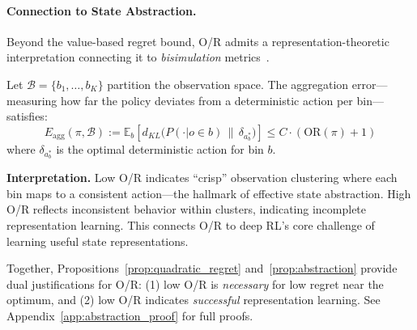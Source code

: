 
\paragraph{Connection to State Abstraction.}
Beyond the value-based regret bound, O/R admits a representation-theoretic interpretation connecting it to \textit{bisimulation} metrics~\citep{ferns2004bisimulation}.

\begin{proposition}
\label{prop:abstraction}
Let $\mathcal{B} = \{b_1, \dots, b_K\}$ partition the observation space. The aggregation error---measuring how far the policy deviates from a deterministic action per bin---satisfies:
\begin{equation}
E_{\text{agg}}(\pi, \mathcal{B}) := \mathbb{E}_{b}\left[ d_{KL}\big(P(\cdot | o \in b) \,\|\, \delta_{a^*_b}\big) \right] \leq C \cdot (\text{OR}(\pi) + 1)
\end{equation}
where $\delta_{a^*_b}$ is the optimal deterministic action for bin $b$.
\end{proposition}

\textbf{Interpretation.} Low O/R indicates ``crisp'' observation clustering where each bin maps to a consistent action---the hallmark of effective state abstraction. High O/R reflects inconsistent behavior within clusters, indicating incomplete representation learning. This connects O/R to deep RL's core challenge of learning useful state representations.

Together, Propositions~\ref{prop:quadratic_regret} and~\ref{prop:abstraction} provide dual justifications for O/R: (1) low O/R is \textit{necessary} for low regret near the optimum, and (2) low O/R indicates \textit{successful} representation learning. See Appendix~\ref{app:abstraction_proof} for full proofs.

